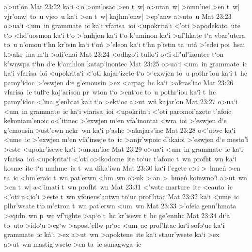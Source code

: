 a>ut'on\bibvsend
\vs Mat 23:22
ka`i
<o
>om'osac
>en
t~w|
o>uran~w|
>omn'uei
>en
t~w|
vjr'onw|
to~u
vjeo~u
ka`i
>en
t~w|
kajhm'enw|
>ep'anw
a>uto~u\bibvsend
\vs Mat 23:23
o>ua`i
<um~in
grammate~ic
ka`i
vfarisa~ioi
<upokrita`i
<'oti
>apodekato~ute
t`o
<hd'uosmon
ka`i
t`o
>'anhjon
ka`i
t`o
k'uminon
ka`i
>af'hkate
t`a
vbar'utera
to~u
n'omou
t`hn
kr'isin
ka`i
t`on\r{}
>'eleon
ka`i
t`hn
p'istin
ta~ut\r{a}
>'edei
poi~hsai
k>ake~ina
m`h
>afi'enai\bibvsend
\vs Mat 23:24
<odhgo`i
tuflo`i
o<i
di"ul'izontec
t`on
k'wnwpa
t`hn
d`e
k'amhlon
katap'inontec\bibvsend
\vs Mat 23:25
o>ua`i
<um~in
grammate~ic
ka`i
vfarisa~ioi
<upokrita`i
<'oti
kajar'izete
t`o
>'exwjen
to~u
pothr'iou
ka`i
t~hc
paroy'idoc
>'eswjen
d`e
g'emousin
>ex
<arpag~hc
ka`i
>a\r{k}ras'iac\bibvsend
{}
\vs Mat 23:26
vfarisa~ie
tufl`e
kaj'arison
pr~wton
t`o
>ent`oc
to~u
pothr'iou
ka`i\r{}
t~hc
paroy'idoc
<'ina
g'enhtai
ka`i
t`o
>ekt`oc
a>ut~w\r{n}
kajar'on\bibvsend
\vs Mat 23:27
o>ua`i
<um~in
grammate~ic
ka`i
vfarisa~ioi
<upokrita`i
<'oti
paromoi'azete
t'afoic
kekoniam'enoic
o<'itinec
>'exwjen
m`en
vfa'inontai
<wra~ioi
>'eswjen
d`e
g'emousin
>ost'ewn
nekr~wn
ka`i
p'ashc
>akajars'iac\bibvsend
\vs Mat 23:28
o<'utwc
ka`i
<ume~ic
>'exwjen
m`en
vfa'inesje
to~ic
>anjr'wpoic
d'ikaioi
>'eswjen
d`e
mesto'i\r{}
>este
<upokr'isewc
ka`i
>anom'iac\bibvsend
\vs Mat 23:29
o>ua`i
<um~in
grammate~ic
ka`i
vfarisa~ioi
<upokrita`i
<'oti
o>ikodome~ite
to`uc
t'afouc
t~wn
profht~wn
ka`i
kosme~ite
t`a
mnhme~ia
t~wn
dika'iwn\bibvsend
\vs Mat 23:30
ka`i
l'egete
e>i
>~hme\r{n}
>en
ta~ic
<hm'eraic
t~wn
pat'erwn
<hm~wn
o>uk
>`an
>~hme\r{n}
koinwno`i\r{}
a>ut~wn
>en
t~w|
a<'imati
t~wn
profht~wn\bibvsend
\vs Mat 23:31
<'wste
marture~ite
<eauto~ic
<'oti
u<io'i
>este
t~wn
vfoneus'antwn
to`uc
prof'htac\bibvsend
\vs Mat 23:32
ka`i
<ume~ic
plhr'wsate
t`o
m'etron
t~wn
pat'erwn
<um~wn\bibvsend
\vs Mat 23:33
>'ofeic
genn'hmata
>eqidn~wn
p~wc
vf'ughte
>ap`o
t~hc
kr'isewc
t~hc
ge'ennhc\bibvsend
\vs Mat 23:34
di`a
to~uto
>ido`u
>eg`w
>apost'ellw
pr`oc
<um~ac
prof'htac
ka`i
sofo`uc
ka`i
grammate~ic
k\r{a}`i
>ex
a>ut~wn
>apoktene~ite
ka`i
staur'wsete
ka`i
>ex
a>ut~wn
mastig'wsete
>en
ta~ic
sunagwga~ic
